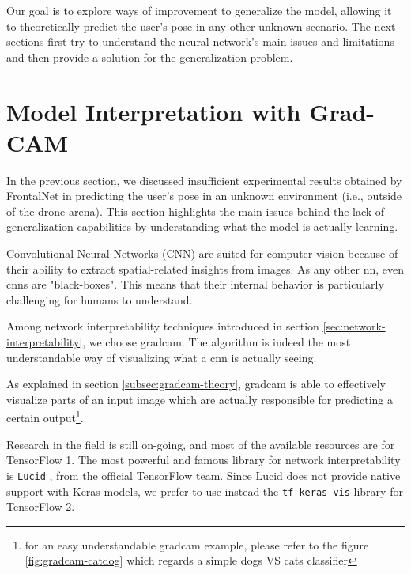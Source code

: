 \medskip

Our goal is to explore ways of improvement to generalize the model, allowing it to theoretically predict the user's pose in any other unknown scenario. The next sections first try to understand the neural network's main issues and limitations and then provide a solution for the generalization problem.




\section{Model Interpretation with Grad-CAM}
\label{sec:model-interpretration}


In the previous section, we discussed insufficient experimental results obtained by FrontalNet in predicting the user's pose in an unknown environment (i.e., outside of the drone arena). This section highlights the main issues behind the lack of generalization capabilities by understanding what the model is actually learning.

\medskip

Convolutional Neural Networks (CNN) are suited for computer vision because of their ability to extract spatial-related insights from images. As any other \gls{nn}, even \gls{cnn}s are "black-boxes". This means that their internal behavior is particularly challenging for humans to understand.

Among network interpretability techniques introduced in section \ref{sec:network-interpretability}, we choose \gls{gradcam}. The algorithm is indeed the most understandable way of visualizing what a \gls{cnn} is actually seeing.

As explained in section \ref{subsec:gradcam-theory}, \gls{gradcam} is able to effectively visualize parts of an input image which are actually responsible for predicting a certain output\footnote{for an easy understandable \gls{gradcam} example, please refer to the figure \ref{fig:gradcam-catdog} which regards a simple dogs VS cats classifier}.

\medskip

Research in the field is still on-going, and most of the available resources are for TensorFlow 1. The most powerful and famous library for network interpretability is \texttt{Lucid} \cite{tf-lucid}, from the official TensorFlow team. Since Lucid does not provide native support with Keras models, we prefer to use instead the \texttt{tf-keras-vis} library \cite{tf-keras-vis} for TensorFlow 2.



